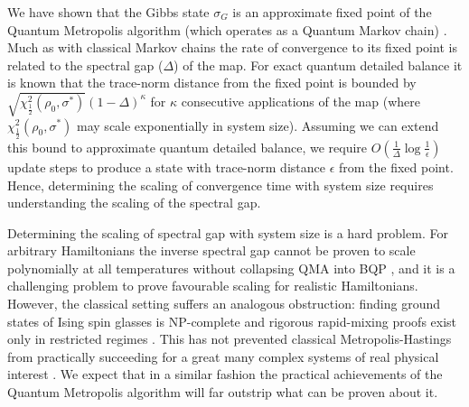 We have shown that the Gibbs state $\sigma_G$ is an approximate fixed point of the Quantum Metropolis algorithm (which operates as a Quantum Markov chain) . Much as with classical Markov chains the rate of convergence to its fixed point is related to the spectral gap ($\Delta$) of the map. For exact quantum detailed balance it is known \cite{temme2010chi} that the trace-norm distance from the fixed point is bounded by $\sqrt{\chi^2_{\frac{1}{2}}(\rho_0,\sigma^*)} (1-\Delta)^\kappa$ for $\kappa$ consecutive applications of the map (where $\chi^2_{\frac{1}{2}}(\rho_0,\sigma^*)$ may scale exponentially in system size). Assuming we can extend this bound to approximate quantum detailed balance, we require $O(\frac{1}{\Delta}\log \frac{1}{\epsilon})$ update steps to produce a state with trace-norm distance $\epsilon$ from the fixed point. Hence, determining the scaling of convergence time with system size requires understanding the scaling of the spectral gap.

Determining the scaling of spectral gap with system size is a hard problem. For arbitrary Hamiltonians the inverse spectral gap cannot be proven to scale polynomially at all temperatures without collapsing QMA into BQP \cite{oliveira2008complexityquantumspinsystems, Aharonov_2009, Schuch_2009}, and it is a challenging problem to prove favourable scaling for realistic Hamiltonians. However, the classical setting suffers an analogous obstruction: finding ground states of Ising spin glasses is NP-complete \cite{Barahona:1982zdv} and rigorous rapid-mixing proofs exist only in restricted regimes \cite{Martinelli1999}. This has not prevented classical Metropolis-Hastings from practically succeeding for a great many complex systems of real physical interest \cite{thijssen2007computational}. We expect that in a similar fashion the practical achievements of the Quantum Metropolis algorithm will far outstrip what can be proven about it. 
 
